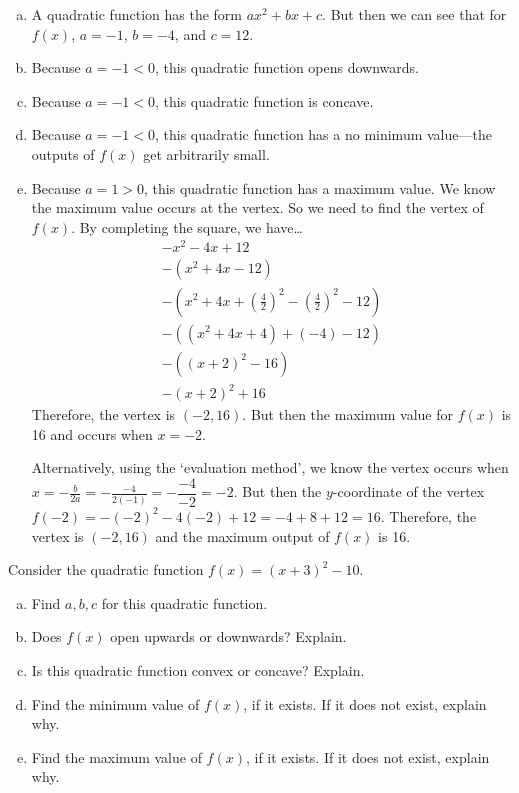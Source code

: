 \documentclass[11pt,letterpaper]{article}
\begin{document}
\sol 
\begin{enumerate}[(a)]
\item A quadratic function has the form $ax^2 + bx + c$. But then we can see that for $f(x)$, $a= -1$, $b= -4$, and $c= 12$. \pspace

\item Because $a= -1 < 0$, this quadratic function opens downwards. \pspace

\item Because $a= -1 < 0$, this quadratic function is concave. \pspace

\item Because $a= -1 < 0$, this quadratic function has a no minimum value---the outputs of $f(x)$ get arbitrarily small. \pspace

\item Because $a= 1 > 0$, this quadratic function has a maximum value. We know the maximum value occurs at the vertex. So we need to find the vertex of $f(x)$. By completing the square, we have\dots
	\[
	\begin{gathered}
	-x^2 - 4x + 12 \\
	-(x^2 + 4x - 12) \\
	-\left(x^2 + 4x + \left(\frac{4}{2} \right)^2 - \left(\frac{4}{2} \right)^2 - 12 \right) \\
	-\left( (x^2 + 4x + 4) + (-4) - 12 \right) \\
	-\left( (x + 2)^2 - 16 \right) \\
	-(x + 2)^2 + 16
	\end{gathered}
	\]
Therefore, the vertex is $(-2, 16)$. But then the maximum value for $f(x)$ is 16 and occurs when $x= -2$. \pspace

Alternatively, using the `evaluation method', we know the vertex occurs when $x= -\frac{b}{2a}= -\frac{-4}{2(-1)}= -\dfrac{-4}{-2}= -2$. But then the $y$-coordinate of the vertex $f(-2)= -(-2)^2 - 4(-2) + 12= -4 + 8 + 12= 16$. Therefore, the vertex is $(-2, 16)$ and the maximum output of $f(x)$ is 16. 
\end{enumerate}



\newpage



 Consider the quadratic function $f(x)= (x + 3)^2 - 10$.
	\begin{enumerate}[(a)]
	\item Find $a, b, c$ for this quadratic function.
	\item Does $f(x)$ open upwards or downwards? Explain.
	\item Is this quadratic function convex or concave? Explain. 
	\item Find the minimum value of $f(x)$, if it exists. If it does not exist, explain why.  
	\item Find the maximum value of $f(x)$, if it exists. If it does not exist, explain why. 
	\end{enumerate} \pspace
\end{document}
